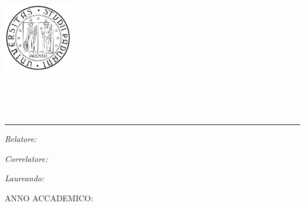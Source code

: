 
\begin{titlepage}
	\begin{addmargin}[-1cm]{-3cm}
    \begin{center}
                
        \includegraphics[width=3cm]{./Figure/unipd_sigilloBW.pdf}
        
        \vfill
        \Large{\textbf{\myUni}}\\
        \vspace{1cm}
        \large{\myDepartment} \\ 
        \large{\myDegree} \\
        \vspace{0.5cm}
        \rule{3.5cm}{1pt}
        \vskip 2cm

        
        \Large{\textbf{\textit{\mySubtitle}}}

        \vfill

        \begingroup
        \huge{\myTitle}\par\bigskip
        \endgroup
    \end{center} 

        \vfill
        
        \noindent\large{\textit{Relatore: }\myProf}
        
        \bigskip       
        \noindent\large{\textit{Correlatore: }\myOtherProf} 

        \vfill
        
        \hfill \large{\textit{Laureando: }\myName}\par %
        
        \hfill \large \myMatricula\par
        
        \vfill 
        \begin{center}
        \large{ANNO ACCADEMICO: \myAcademicYear}
        \end{center}                     
 
  \end{addmargin}  
  \end{titlepage}   